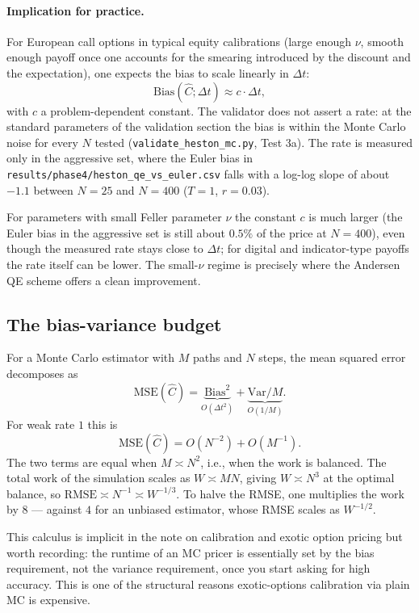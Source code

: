 \documentclass[11pt]{article}
\theoremstyle{plain}
\theoremstyle{definition}
\theoremstyle{remark}
\begin{document}
\paragraph{Implication for practice.} For European call options in typical equity calibrations (large enough $\nu$, smooth enough payoff once one accounts for the smearing introduced by the discount and the expectation), one expects the bias to scale linearly in $\Delta t$:
\[
    \mathrm{Bias}(\widehat C; \Delta t) \approx c \cdot \Delta t,
\]
with $c$ a problem-dependent constant. The validator does not assert a rate: at the standard parameters of the validation section the bias is within the Monte Carlo noise for every $N$ tested (\texttt{validate\_heston\_mc.py}, Test 3a). The rate is measured only in the aggressive set, where the Euler bias in \texttt{results/phase4/heston\_qe\_vs\_euler.csv} falls with a log-log slope of about $-1.1$ between $N = 25$ and $N = 400$ ($T = 1$, $r = 0.03$).

For parameters with small Feller parameter $\nu$ the constant $c$ is much larger (the Euler bias in the aggressive set is still about $0.5\%$ of the price at $N = 400$), even though the measured rate stays close to $\Delta t$; for digital and indicator-type payoffs the rate itself can be lower. The small-$\nu$ regime is precisely where the Andersen QE scheme offers a clean improvement.

\subsection{The bias-variance budget}

For a Monte Carlo estimator with $M$ paths and $N$ steps, the mean squared error decomposes as
\[
    \mathrm{MSE}(\widehat C) = \underbrace{\mathrm{Bias}^2}_{O(\Delta t^2)} + \underbrace{\mathrm{Var}/M}_{O(1/M)}.
\]
For weak rate $1$ this is
\[
    \mathrm{MSE}(\widehat C) = O(N^{-2}) + O(M^{-1}).
\]
The two terms are equal when $M \asymp N^2$, i.e., when the work is balanced. The total work of the simulation scales as $W \asymp M N$, giving $W \asymp N^3$ at the optimal balance, so $\mathrm{RMSE} \asymp N^{-1} \asymp W^{-1/3}$. To halve the RMSE, one multiplies the work by $8$ --- against $4$ for an unbiased estimator, whose RMSE scales as $W^{-1/2}$.

This calculus is implicit in the note on calibration and exotic option pricing but worth recording: the runtime of an MC pricer is essentially set by the bias requirement, not the variance requirement, once you start asking for high accuracy. This is one of the structural reasons exotic-options calibration via plain MC is expensive.
\end{document}
